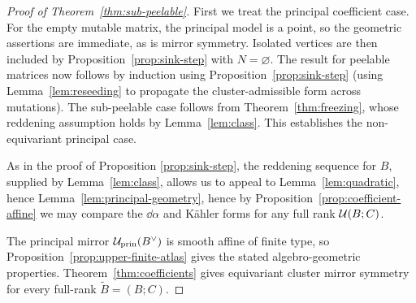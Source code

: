 \documentclass[12pt, letter]{amsart}
\theoremstyle{definition}
\newcommand{\pr}{\mathrm{prin}}
\numberwithin{equation}{section}
\begin{document}
\begin{proof}[Proof of Theorem~\ref{thm:sub-peelable}]
First we treat the principal coefficient case.
For the empty mutable matrix, the principal model is a
point, so the geometric assertions are immediate, as is mirror symmetry. Isolated vertices are
then included by Proposition~\ref{prop:sink-step} with $N=\varnothing$.
The result for peelable matrices now follows by induction using Proposition~\ref{prop:sink-step} (using Lemma~\ref{lem:reseeding} to propagate the cluster-admissible form across mutations).  The sub-peelable case follows from Theorem~\ref{thm:freezing}, whose reddening assumption holds by Lemma~\ref{lem:class}.
This establishes the non-equivariant principal case.

As in the proof of Proposition \ref{prop:sink-step}, 
the reddening sequence for $B$, supplied by Lemma~\ref{lem:class}, allows us to appeal to Lemma~\ref{lem:quadratic}, hence Lemma~\ref{lem:principal-geometry},
hence by Proposition~\ref{prop:coefficient-affine} we may compare the $\dd\alpha$ and K\"ahler forms for any full rank $\mathcal{U}(B;C)$.


The principal mirror $\cU_{\pr}(B^\vee)$ is smooth affine of
finite type, so Proposition~\ref{prop:upper-finite-atlas} gives the stated algebro-geometric properties. 
Theorem~\ref{thm:coefficients} gives equivariant cluster mirror
symmetry for every full-rank $\widetilde B=(B;C)$.
\end{proof}






















\newpage





\end{document}
